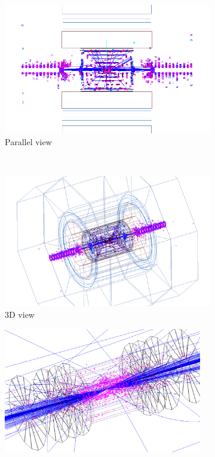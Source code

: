  \begin{figure}[h]
 \centering
  \begin{subfigure}[b]{0.49\textwidth}
   \centering
    \includegraphics[width=\textwidth]{Figures/Pairs/Event_display_ILC500_rhoz_view_inverted.png}
   \caption{Parallel view}
   \end{subfigure}\\
    \begin{subfigure}[b]{0.49\textwidth}
   \centering
    \includegraphics[width=\textwidth]{Figures/Pairs/Event_display_ILC500_3D_view2_inverted.png}
   \caption{3D view}
   \end{subfigure}
   \hfill
    \begin{subfigure}[b]{0.49\textwidth}
   \centering
    \includegraphics[width=0.95\textwidth]{Figures/Pairs/Event_display_ILC500_vertex_3D_view2_inverted.png}

\end{subfigure}
\end{figure}

